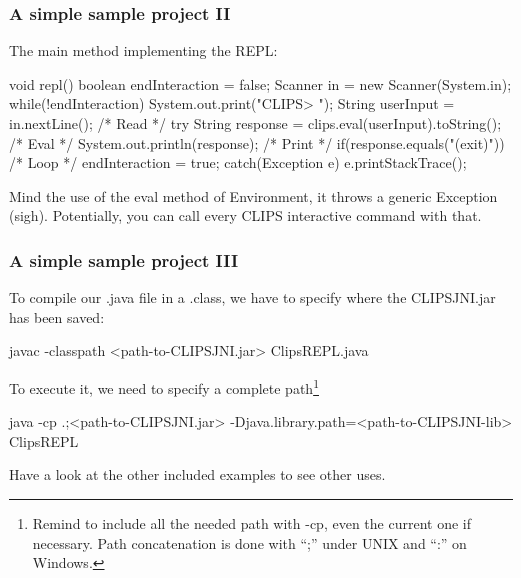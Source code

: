 \documentclass[xcolor={usenames,dvipsnames,svgnames}, compress]{beamer}
\begin{document}
\begin{frame}[fragile]
  \frametitle{A simple sample project II}
  The main method implementing the REPL:
  \begin{java-code}
    void repl() {
      boolean endInteraction = false;
      Scanner in = new Scanner(System.in);
      while(!endInteraction) {
        System.out.print("CLIPS> ");
        String userInput = in.nextLine(); /* Read */
        try {
          String response = clips.eval(userInput).toString(); /* Eval */
          System.out.println(response); /* Print */
          if(response.equals("(exit)")){ /* Loop */
             endInteraction = true;}
        }catch(Exception e) {
          e.printStackTrace();}}}
  \end{java-code}

  Mind the use of the \textsf{eval} method of \textsf{Environment}, it
  throws a generic \textsf{Exception} (sigh). Potentially, you can call
  every CLIPS interactive command with that.
\end{frame}

\begin{frame}[fragile]
  \frametitle{A simple sample project III}
  To compile our \textsf{.java} file in a \textsf{.class}, we have to
  specify where the \textsf{CLIPSJNI.jar} has been saved:
  \begin{clips-code}[numbers=none]
    javac -classpath <path-to-CLIPSJNI.jar> ClipsREPL.java
  \end{clips-code}\bigskip

  To execute it, we need to specify a complete path\footnote{Remind to
  include all the needed path with \textsf{-cp}, even the current one
  if necessary. Path concatenation is done with ``;'' under UNIX and
  ``:'' on Windows.}
  \begin{clips-code}
    java -cp .;<path-to-CLIPSJNI.jar> -Djava.library.path=<path-to-CLIPSJNI-lib> ClipsREPL
  \end{clips-code}\bigskip

  Have a look at the other included examples to see other uses.
\end{frame}
\end{document}
